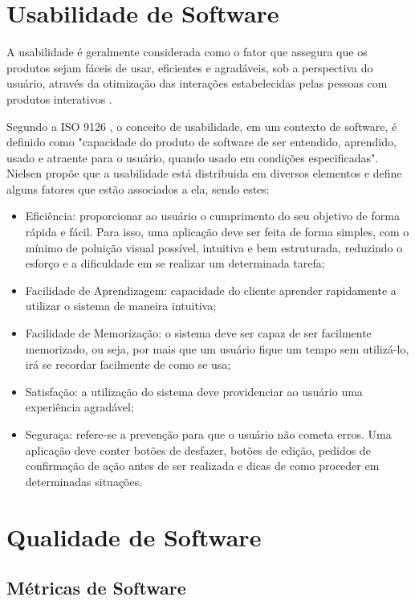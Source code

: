 \section{Usabilidade de Software}
A usabilidade é geralmente considerada como o fator que assegura que
os produtos sejam fáceis de usar, eficientes e agradáveis, sob a
perspectiva do usuário, através da otimização das interações
estabelecidas pelas pessoas com produtos interativos \cite{rogers_2013}.

Segundo a ISO 9126 \cite{iso9126}, o conceito de usabilidade, em um contexto de software, é definido como "capacidade do produto de software de ser entendido, aprendido, usado e atraente para o usuário, quando usado em condições especificadas". Nielsen \cite{nielsen_1994} propõe que a usabilidade está distribuida em diversos elementos e define alguns fatores que estão associados a ela, sendo estes:

\begin{itemize}
    \item Eficiência: proporcionar ao usuário o cumprimento do seu objetivo de forma rápida e fácil. Para isso, uma aplicação deve ser feita de forma simples, com o mínimo de poluição visual possível, intuitiva e bem estruturada, reduzindo o esforço e a dificuldade em se realizar um determinada tarefa;
    \item Facilidade de Aprendizagem: capacidade do cliente aprender rapidamente a utilizar o sistema de maneira intuitiva;
    \item Facilidade de Memorização: o sistema deve ser capaz de ser facilmente memorizado, ou seja, por mais que um usuário fique um tempo sem utilizá-lo, irá se recordar facilmente de como se usa;
    \item Satisfação: a utilização do sistema deve providenciar ao usuário uma experiência agradável;
    \item Seguraça: refere-se a prevenção para que o usuário não cometa erros. Uma aplicação deve conter botões de desfazer, botões de edição, pedidos de confirmação de ação antes de ser realizada e dicas de como proceder em determinadas situações.
\end{itemize}

\section{Qualidade de Software}

\subsection{Métricas de Software}

